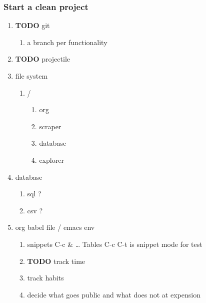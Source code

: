 \documentclass[11pt]{article}
\begin{document}
\subsubsection{Start a clean project}
\label{sec:org26186da}
\begin{enumerate}
\item {\bfseries\sffamily TODO} git
\label{sec:org7e05ae5}
\begin{enumerate}
\item a branch per functionality
\label{sec:org26d61b5}
\end{enumerate}
\item {\bfseries\sffamily TODO} projectile
\label{sec:org7777ba1}
\item file system
\label{sec:orgdf3cf62}
\begin{enumerate}
\item /
\label{sec:org46ba94a}
\begin{enumerate}
\item org
\label{sec:org701c64b}
\item scraper
\label{sec:orgdd20c79}
\item database
\label{sec:org1bf1306}
\item explorer
\label{sec:org8c5e92b}
\end{enumerate}
\end{enumerate}
\item database
\label{sec:orgae2c9be}
\begin{enumerate}
\item sql ?
\label{sec:org1db0e29}
\item csv ?
\label{sec:orgcf75aee}
\end{enumerate}
\item org babel file / emacs env
\label{sec:org1b2bcb1}
\begin{enumerate}
\item snippets
\label{sec:orgda7c92b}
C-c \& \ldots{}
Tables
C-c C-t is snippet mode for test
\item {\bfseries\sffamily TODO} track time
\label{sec:org1dd1470}
\item track habits
\label{sec:org632ce02}
\item decide what goes public and what does not at expension
\label{sec:orgb0263e9}
\end{enumerate}
\end{enumerate}
\end{document}
